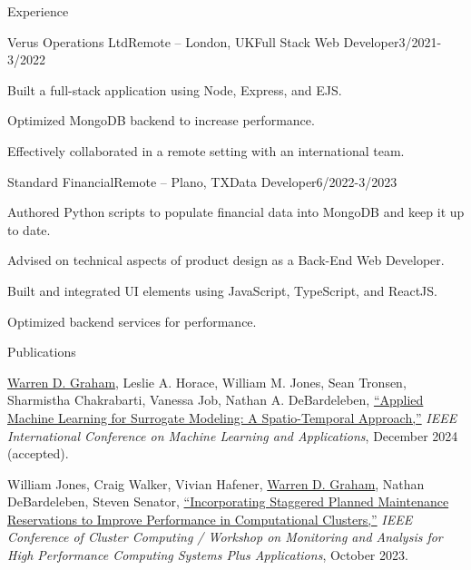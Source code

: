 \documentclass{resume} %
\begin{document}
\begin{rSection}{Experience}
\begin{rSubsection}{Verus Operations Ltd}{Remote – London, UK}{Full Stack Web Developer}{3/2021-3/2022}
  \item Built a full-stack application using Node, Express, and EJS.
  \item Optimized MongoDB backend to increase performance.
  \item Effectively collaborated in a remote setting with an international team.
\end{rSubsection}

\begin{rSubsection}{Standard Financial}{Remote – Plano, TX}{Data Developer}{6/2022-3/2023}
  \item Authored Python scripts to populate financial data into MongoDB and keep it up to date. 
  \item Advised on technical aspects of product design as a Back-End Web Developer.
  \item Built and integrated UI elements using JavaScript, TypeScript, and ReactJS.
  \item Optimized backend services for performance.
\end{rSubsection}

\end{rSection} 

\begin{rSection}{Publications} 
  \itemsep -1pt
  \renewcommand{\labelenumi}{[\theenumi]}
  \begin{etaremune}
    \item \underline{Warren D. Graham}, Leslie A. Horace, William M. Jones, Sean Tronsen, Sharmistha Chakrabarti, Vanessa Job, Nathan A. DeBardeleben, \href{https://doi.org/10.1109/ICMLA61862.2024.00114}{“Applied Machine Learning for Surrogate Modeling: A Spatio-Temporal Approach,”} \textit{IEEE International Conference on Machine Learning and Applications}, December 2024 (accepted).
    \item William Jones, Craig Walker, Vivian Hafener, \underline{Warren D. Graham}, Nathan DeBardeleben, Steven Senator, \href{https://doi.org/10.1109/CLUSTERWorkshops61457.2023.00015}{“Incorporating Staggered Planned Maintenance Reservations to Improve Performance in Computational Clusters,”} \textit{IEEE Conference of Cluster Computing / Workshop on Monitoring and Analysis for High Performance Computing Systems Plus Applications}, October 2023.
  \end{etaremune}
\end{rSection}
\end{document}
